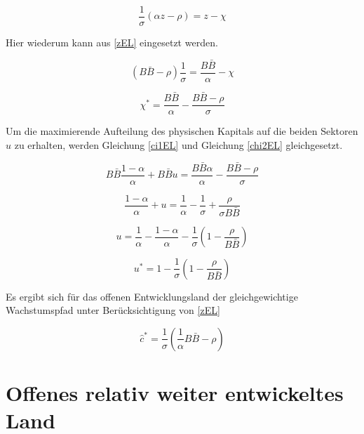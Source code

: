 	\begin{equation}
		\frac{1}{\sigma}(\alpha z- \rho) = z - \chi
	\end{equation}


Hier wiederum kann aus \eqref{zEL} eingesetzt werden. 


	\begin{equation}
		(B \bar{B} - \rho) \frac{1}{\sigma} = \frac{B \bar{B}}{\alpha} - \chi
	\end{equation}


	\begin{equation}
		\boxed{\chi^* = \frac{B \bar{B}}{\alpha}- \frac{B \bar{B}- \rho}{\sigma}\label{chi2EL}}
	\end{equation}


Um die maximierende Aufteilung des physischen Kapitals auf die beiden Sektoren $u$ zu erhalten, werden Gleichung \eqref{ci1EL} und Gleichung \eqref{chi2EL} gleichgesetzt. 


	\begin{equation}
		B \bar{B} \frac{1- \alpha}{\alpha} +  B \bar{B} u = \frac{B \bar{B} \alpha}{\alpha} - \frac{B \bar{B} - \rho}{\sigma}
	\end{equation}


	\begin{equation*}
		\frac{1- \alpha}{\alpha} + u = \frac{1}{\alpha} - \frac{1}{\sigma} + \frac{\rho}{ \sigma B \bar{B}}
	\end{equation*}


	\begin{equation*}
		u= \frac{1}{\alpha} - \frac{1- \alpha}{\alpha} - \frac{1}{\sigma}\left(1- \frac{\rho}{B \bar{B}}\right)
	\end{equation*}


	\begin{equation}
		\boxed{u^*= 1- \frac{1}{\sigma}\left(1-  \frac{\rho}{B \bar{B}}\right)}
	\end{equation}


Es ergibt sich für das offenen Entwicklungsland der gleichgewichtige Wachstumspfad unter Berücksichtigung von \eqref{zEL}


	\begin{equation}
		\boxed{\hat{c}^*=\frac{1}{\sigma}\left(\frac{1}{\alpha} B\bar{B}-\rho\right)}
	\end{equation}



\section[Offenes relativ weiter entwickeltes Land]{Offenes relativ weiter entwickeltes Land }\label{APPENDIXIL}


